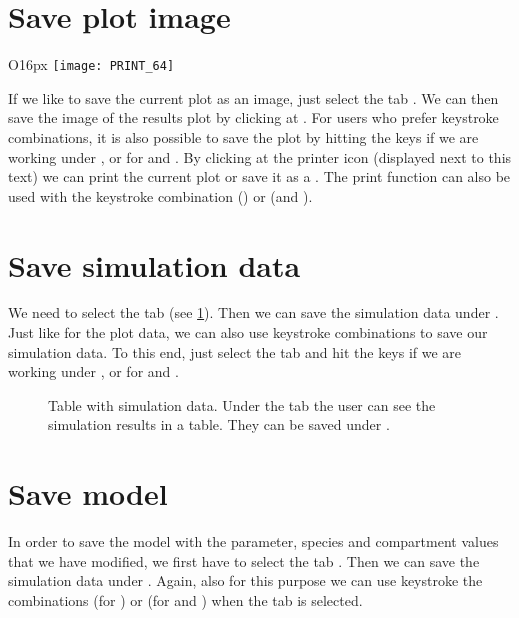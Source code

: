 \section{Save plot image}
\begin{wrapfigure}{O}{16px}
\vspace{\wrapfigspace}
\texttt{[image: PRINT\_64]}
\end{wrapfigure}
If we like to save the current plot as an image, just select the tab .
We can then save the image of the results plot by clicking at .
For users who prefer keystroke combinations, it is also possible to save the plot by hitting the keys  if we are working under \MacOSX, or  for \Linux and \Windows.
By clicking at the printer icon (displayed next to this text) we can print the current plot or save it as a \PDF.
The print function can also be used with the keystroke combination  (\MacOSX) or  (\Windows and \Linux).

\section{Save simulation data}
\label{ch:savesim}
We need to select the tab  (see \cref{fig:saveSimulationResults}).
Then we can save the simulation data under .
Just like for the plot data, we can also use keystroke combinations to save our simulation data. To this end, just select the tab  and hit the keys  if we are working under \MacOSX, or  for \Linux and \Windows.
\begin{figure}[h]
\centering
{}
\caption[Table with simulation data]{Table with simulation data.
Under the tab  the user can see the simulation results in a table.
They can be saved under .}
\label{fig:saveSimulationResults}
\end{figure}

\section{Save model}
In order to save the model with the parameter, species and compartment values that we have modified, we first have to select the tab .
Then we can save the simulation data under .
Again, also for this purpose we can use keystroke the combinations  (for \MacOSX) or  (for \Linux and \Windows) when the  tab is selected.

